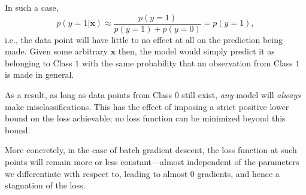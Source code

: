 \documentclass{article}[a4paper]
\begin{document}
	In such a case, \[
		p \left( y = 1 \vert \mathbf{x} \right)
		\approx
		\dfrac{
			p \left( y = 1 \right)
		}{
			p \left( y = 1 \right) + p \left( y = 0 \right)
		}
		= p \left( y = 1 \right),
	\] i.e., the data point will have little to no effect at all on the prediction being made. Given some arbitrary $\mathbf{x}$ then, the model would simply predict it as belonging to Class $1$ with the same probability that an observation from Class $1$ is made in general.
	
	As a result, as long as data points from Class $0$ still exist, \textit{any} model will \textit{always} make misclassifications. This has the effect of imposing a strict positive lower bound on the loss achievable; no loss function can be minimized beyond this bound. 
	
	More concretely, in the case of batch gradient descent, the loss function at such points will remain more or less constant---almost independent of the parameters we differentiate with respect to, leading to almost $0$ gradients, and hence a stagnation of the loss.
\end{document}

